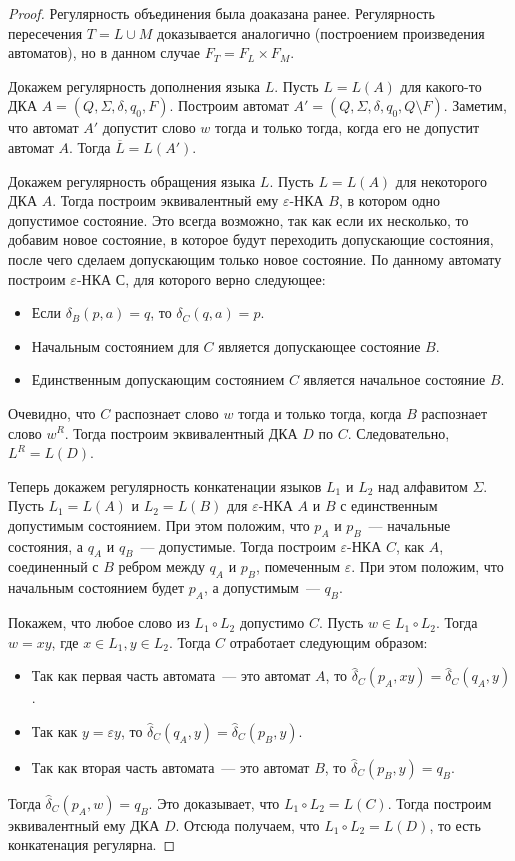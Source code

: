 \documentclass[a4paper,12pt]{article}
\begin{document}
	\begin{proof}
		Регулярность объединения была доаказана ранее. Регулярность пересечения $T = L \cup M$ доказывается аналогично (построением произведения автоматов), но в данном случае $F_T = F_L \times F_M$.
		
		Докажем регулярность дополнения языка $L$. Пусть $L = L(A)$ для какого-то ДКА $A = (Q, \Sigma, \delta, q_0, F)$. Построим автомат $A' = (Q, \Sigma, \delta, q_0, Q \setminus F)$. Заметим, что автомат $A'$ допустит слово $w$ тогда и только тогда, когда его не допустит автомат $A$. Тогда $\overline{L} = L(A')$.
		
		Докажем регулярность обращения языка $L$. Пусть $L = L(A)$ для некоторого ДКА $A$. Тогда построим эквивалентный ему $\varepsilon$-НКА $B$, в котором одно допустимое состояние. Это всегда возможно, так как если их несколько, то добавим новое состояние, в которое будут переходить допускающие состояния, после чего сделаем допускающим только новое состояние. По данному автомату построим $\varepsilon$-НКА $С$, для которого верно следующее: 
		\begin{itemize}
			\item Если $\delta_B(p, a) = q$, то $\delta_C(q, a) = p$.
			\item Начальным состоянием для $C$ является допускающее состояние $B$.
			\item Единственным допускающим состоянием $C$ является начальное состояние $B$.
		\end{itemize}
		Очевидно, что $C$ распознает слово $w$ тогда и только тогда, когда $B$ распознает слово $w^R$. Тогда построим эквивалентный ДКА $D$ по $C$. Следовательно, $L^R = L(D)$.
		
		Теперь докажем регулярность конкатенации языков $L_1$ и $L_2$ над алфавитом $\Sigma$. Пусть $L_1 = L(A)$ и $L_2 = L(B)$ для $\varepsilon$-НКА $A$ и $B$ с единственным допустимым состоянием. При этом положим, что $p_A$ и $p_B$~--- начальные состояния, а $q_A$ и $q_B$~--- допустимые. Тогда построим $\varepsilon$-НКА $C$, как $A$, соединенный с $B$ ребром между $q_A$ и $p_B$, помеченным $\varepsilon$. При этом положим, что начальным состоянием будет $p_A$, а допустимым~--- $q_B$. 
		
		Покажем, что любое слово из $L_1 \circ L_2$ допустимо $C$. Пусть $w \in L_1 \circ L_2$. Тогда $w = xy$, где $x \in L_1, y \in L_2$. Тогда $C$ отработает следующим образом:
		\begin{itemize}
			\item Так как первая часть автомата~--- это автомат $A$, то $\hat{\delta}_C(p_A, xy) = \hat{\delta}_C(q_A, y)$.
			\item Так как $y = \varepsilon y$, то $\hat{\delta}_C(q_A, y) = \hat{\delta}_C(p_B, y)$.
			\item Так как вторая часть автомата~--- это автомат $B$, то $\hat{\delta}_C(p_B, y) = q_B$.
		\end{itemize}
		Тогда $\hat{\delta}_C(p_A, w)= q_B$. Это доказывает, что $L_1 \circ L_2 = L(C)$. Тогда построим эквивалентный ему ДКА $D$. Отсюда получаем, что $L_1 \circ L_2 = L(D)$, то есть конкатенация регулярна.
		

\end{proof}
\end{document}
